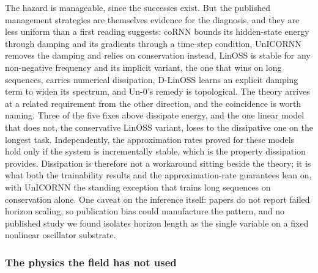 \documentclass[a4paper,fleqn]{cas-sc}
\begin{document}
The hazard is manageable, since the successes exist. But the published
management strategies are themselves evidence for the diagnosis, and
they are less uniform than a first reading suggests: coRNN bounds its
hidden-state energy through damping and its gradients through a
time-step condition, UnICORNN removes the damping and relies on
conservation instead, LinOSS \citep{rusch2025} is stable for any
non-negative frequency and its implicit variant, the one that wins on
long sequences, carries numerical dissipation, D-LinOSS \citep{d-linoss}
learns an explicit damping term to widen its spectrum, and Un-0's remedy
is topological. The theory arrives at a related requirement from the
other direction, and the coincidence is worth naming. Three of the five
fixes above dissipate energy, and the one linear model that does not,
the conservative LinOSS variant, loses to the dissipative one on the
longest task. Independently, the approximation rates proved for these
models hold only if the system is incrementally stable, which is the
property dissipation provides. Dissipation is therefore not a workaround
sitting beside the theory; it is what both the trainability results and
the approximation-rate guarantees lean on, with UnICORNN the standing
exception that trains long sequences on conservation alone. One caveat
on the inference itself: papers do not report failed horizon scaling, so
publication bias could manufacture the pattern, and no published study
we found isolates horizon length as the single variable on a fixed
nonlinear oscillator substrate.

\subsubsection{The physics the field has not used}\label{sec-3-1-5}
\end{document}
